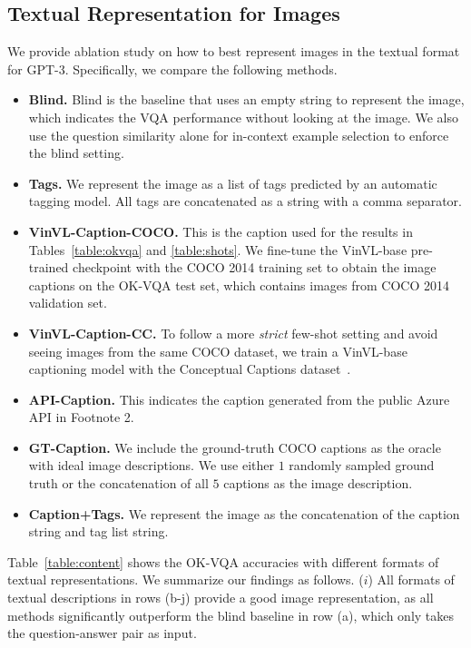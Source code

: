 \subsection{Textual Representation for Images}
We provide ablation study on how to best represent images in the textual format for GPT-3. Specifically, we compare the following methods.
\vspace{-2pt}
\begin{itemize} 
\setlength\itemsep{-2pt}
\item \textbf{Blind.} Blind is the baseline that uses an empty string to represent the image, which indicates the VQA performance without looking at the image. We also use the question similarity alone for in-context example selection to enforce the blind setting.
\item \textbf{Tags.} We represent the image as a list of tags predicted by an automatic tagging model. All tags are concatenated as a string with a comma separator.
\item \textbf{VinVL-Caption-COCO.} This is the caption used for the results in Tables~\ref{table:okvqa} and \ref{table:shots}. We fine-tune the VinVL-base pre-trained checkpoint with the COCO 2014 training set to obtain the image captions on the OK-VQA test set, which contains images from COCO 2014 validation set.
\item \textbf{VinVL-Caption-CC.} To follow a more \emph{strict} few-shot setting and avoid seeing images from the same COCO dataset, we train a VinVL-base captioning model with the Conceptual Captions dataset~\cite{sharma2018conceptual}.
\item \textbf{API-Caption.} This indicates the caption generated from the public Azure API in Footnote 2.
\item \textbf{GT-Caption.} We include the ground-truth COCO captions as the oracle with ideal image descriptions. We use either $1$ randomly sampled ground truth or the concatenation of all $5$ captions as the image description.
\item \textbf{Caption+Tags.} We represent the image as the concatenation of the caption string and tag list string.
\vspace{-2pt}
\end{itemize}
Table~\ref{table:content} shows the OK-VQA accuracies with different formats of textual representations. 
We summarize our findings as follows.
($i$) All formats of textual descriptions in rows (b-j) provide a good image representation, as all methods significantly outperform the blind baseline in row (a), which only takes the question-answer pair as input.
